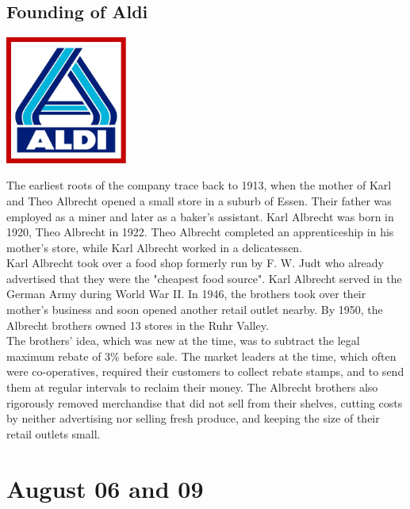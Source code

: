 \documentclass[11pt]{report}
\begin{document}
\subsection{Founding of Aldi}
\vspace{2mm}\begin{center}\includegraphics[width=4cm]{./img/aldiLogo.jpg}\end{center}
The earliest roots of the company trace back to 1913, when the mother of Karl and Theo Albrecht opened a small store in a suburb of Essen. Their father was employed as a miner and later as a baker's assistant. Karl Albrecht was born in 1920, Theo Albrecht in 1922. Theo Albrecht completed an apprenticeship in his mother's store, while Karl Albrecht worked in a delicatessen.\\
\indent Karl Albrecht took over a food shop formerly run by F. W. Judt who already advertised that they were the "cheapest food source". Karl Albrecht served in the German Army during World War II. In 1946, the brothers took over their mother's business and soon opened another retail outlet nearby. By 1950, the Albrecht brothers owned 13 stores in the Ruhr Valley.\\
\indent The brothers' idea, which was new at the time, was to subtract the legal maximum rebate of 3\% before sale. The market leaders at the time, which often were co-operatives, required their customers to collect rebate stamps, and to send them at regular intervals to reclaim their money. The Albrecht brothers also rigorously removed merchandise that did not sell from their shelves, cutting costs by neither advertising nor selling fresh produce, and keeping the size of their retail outlets small.
\section{August 06 and 09}
\end{document}

